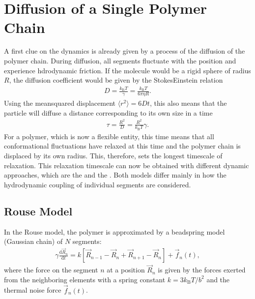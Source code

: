 \documentclass[letterpaper,10pt,english]{sphinxmanual}
\begin{document}
\section{Diffusion of a Single Polymer Chain}
\label{\detokenize{notebooks/L25/1_polymer_dynamics:Diffusion-of-a-Single-Polymer-Chain}}
\sphinxAtStartPar
A first clue on the dynamics is already given by a process of the diffusion of the polymer chain. During diffusion, all segments fluctuate with the position and experience hdrodynamic friction. If the molecule would be a rigid sphere of radius \(R\), the diffusion coefficient would be given by the Stokes\sphinxhyphen{}Einstein relation
\begin{equation*}
\begin{split}D=\frac{k_\mathrm{B}T}{\gamma}=\frac{k_\mathrm{B} T}{6\pi\eta R}.\end{split}
\end{equation*}
\sphinxAtStartPar
Using the mean\sphinxhyphen{}squared displacement \(\langle r^{2}\rangle=6Dt\), this also means that the particle will diffuse a distance corresponding to its own size in a time
\begin{equation*}
\begin{split}\tau=\frac{R^2}{D}=\frac{R^2}{k_\mathrm{B} T}\gamma.\end{split}
\end{equation*}
\sphinxAtStartPar
For a polymer, which is now a flexible entity, this time means that all conformational fluctuations have relaxed at this time and the polymer chain is displaced by its own radius. This, therefore, sets the longest timescale of relaxation. This relaxation timescale can now be obtained with different dynamic approaches, which are the  and the . Both models differ mainly in how the hydrodynamic coupling of individual segments are considered.


\subsection{Rouse Model}
\label{\detokenize{notebooks/L25/1_polymer_dynamics:Rouse-Model}}
\sphinxAtStartPar
In the Rouse model, the polymer is approximated by a bead\sphinxhyphen{}spring model (Gaussian chain) of \(N\) segments:
\begin{equation*}
\begin{split}\gamma\frac{\mathrm{d}\vec{R}_n}{\mathrm{d}t}=k\left [ \vec{R}_{n-1} - \vec{R}_{n} + \vec{R}_{n+1} - \vec{R}_{n}\right ] +\vec{f}_n(t),\end{split}
\end{equation*}
\sphinxAtStartPar
where the force on the segment \(n\) at a position \(\vec{R}_n\) is given by the forces exerted from the neighboring elements with a spring constant \(k=3k_\mathrm{B} T/b^2\) and the thermal noise force \(\vec{f}_n(t)\).
\end{document}
